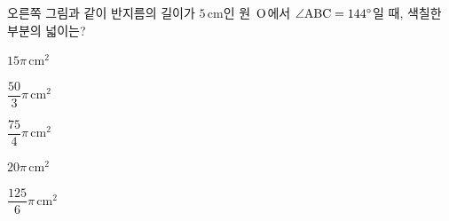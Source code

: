 \noindent\begin{minipage}[t]{0.58\linewidth}\vspace{0pt}\raggedright 오른쪽 그림과 같이 반지름의 길이가 $5\,\mathrm{cm}$인 원~$\mathrm{O}$에서 $\angle\mathrm{ABC}=144^\circ$일 때, 색칠한 부분의 넓이는?\end{minipage}\hfill\begin{minipage}[t]{0.4\linewidth}\vspace{0pt}\centering \resizebox{\ifdim\width>\linewidth\linewidth\else\width\fi}{!}{}\end{minipage}\par
\begin{choicesii}{\rule[-3ex]{0pt}{8ex}$15\pi\,\mathrm{cm}^2$}{\rule[-3ex]{0pt}{8ex}$\dfrac{50}{3}\pi\,\mathrm{cm}^2$}{\rule[-3ex]{0pt}{8ex}$\dfrac{75}{4}\pi\,\mathrm{cm}^2$}{\rule[-3ex]{0pt}{8ex}$20\pi\,\mathrm{cm}^2$}{\rule[-3ex]{0pt}{8ex}$\dfrac{125}{6}\pi\,\mathrm{cm}^2$}\end{choicesii}

